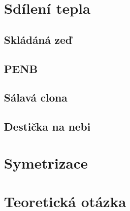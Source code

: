 \documentclass{article}
\begin{document}
\maketitle
\tableofcontents
\newpage



\section{Sdílení tepla}

\subsection{Skládáná zeď}

\subsection{PENB}

\subsection{Sálavá clona}

\subsection{Destička na nebi}



\section{Symetrizace}



\section{Teoretická otázka}
\end{document}
